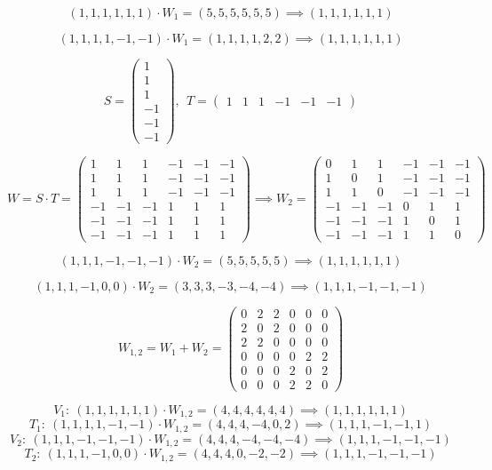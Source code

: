 \begin{problem}[9]
\spart
\[(1,1,1,1,1,1) \cdot W_1 = (5,5,5,5,5,5) \implies (1,1,1,1,1,1) \]

\spart

\[(1,1,1,1,-1,-1) \cdot W_1 = (1,1,1,1,2,2) \implies (1,1,1,1,1,1)\]

\spart

\[S = \left( \begin{array}{c}
1 \\
1 \\
1 \\
-1 \\
-1 \\
-1
\end{array}\right), \ \ T = \left( \begin{array}{cccccc}
1 & 1 & 1 & -1 & -1 & -1
\end{array}\right)\]

\[W = S\cdot T = \left( \begin{array}{cccccc}
1 & 1 & 1 & -1 & -1 & -1 \\
1 & 1 & 1 & -1 & -1 & -1 \\
1 & 1 & 1 & -1 & -1 & -1 \\
-1 & -1 & -1 & 1 & 1 & 1 \\
-1 & -1 & -1 & 1 & 1 & 1 \\
-1 & -1 & -1 & 1 & 1 & 1
\end{array}\right) \implies W_2 = \left( \begin{array}{cccccc}
0 & 1 & 1 & -1 & -1 & -1 \\
1 & 0 & 1 & -1 & -1 & -1 \\
1 & 1 & 0 & -1 & -1 & -1 \\
-1 & -1 & -1 & 0 & 1 & 1 \\
-1 & -1 & -1 & 1 & 0 & 1 \\
-1 & -1 & -1 & 1 & 1 & 0
\end{array}\right) \]

\spart
\[(1,1,1,-1,-1,-1) \cdot W_2 = (5,5,5,5,5) \implies (1,1,1,1,1,1)\]

\spart

\[(1,1,1,-1,0,0) \cdot W_2 = (3,3,3,-3,-4,-4) \implies (1,1,1,-1,-1,-1)\]

\spart

\[W_{1,2} = W_1 + W_2 = \left( \begin{array}{cccccc}
0 & 2 & 2 & 0 & 0 & 0 \\
2 & 0 & 2 & 0 & 0 & 0 \\
2 & 2 & 0 & 0 & 0 & 0 \\
0 & 0 & 0 & 0 & 2 & 2 \\
0 & 0 & 0 & 2 & 0 & 2 \\
0 & 0 & 0 & 2 & 2 & 0
\end{array}\right)\]

\spart

\[V_1: \ (1,1,1,1,1,1)\cdot W_{1,2} = (4,4,4,4,4,4) \implies (1,1,1,1,1,1) \]
\[T_1: \ (1,1,1,1,-1,-1)\cdot W_{1,2} = (4,4,4,-4,0,2) \implies (1,1,1,-1,-1,1) \]
\[V_2: \ (1,1,1,-1,-1,-1)\cdot W_{1,2} = (4,4,4,-4,-4,-4) \implies (1,1,1,-1,-1,-1) \]
\[T_2: \ (1,1,1,-1,0,0)\cdot W_{1,2} = (4,4,4,0,-2,-2) \implies (1,1,1,-1,-1,-1) \]
\end{problem}

